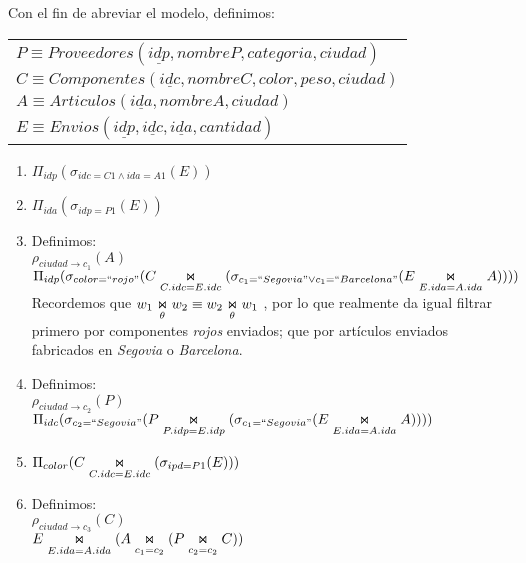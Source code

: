 Con el fin de abreviar el modelo, definimos:
	\begin{center}
		\begin{tabular}{l}
			$P \equiv Proveedores(\underline{idp}, nombreP, categoria, ciudad)$\\
			$C \equiv Componentes(\underline{idc}, nombreC, color, peso, ciudad)$\\
			$A \equiv Articulos(\underline{ida}, nombreA, ciudad)$\\
			$E \equiv Envios(\underline{idp}, \underline{idc}, \underline{ida}, cantidad)$\\
		\end{tabular}
	\end{center}
	\begin{enumerate}
		\item $\Pi_{idp}(\sigma_{idc = C1 \wedge ida = A1}(E))$
		
		\item $\Pi_{ida}(\sigma_{idp = P1}(E))$
		
		\item Definimos:\\ 
		$\rho_{ciudad\rightarrow c_1}(A)$\\
		$\Pi_{idp}(\sigma_{color=``rojo"}(C\innerjoin[C.idc = E.idc](\sigma_{c_1 = ``Segovia" \vee c_1 = ``Barcelona"}(E \innerjoin[E.ida = A.ida] A))))$\\[0.25cm]
		Recordemos que $w_1 \innerjoin w_2 \equiv w_2 \innerjoin w_1$ , por lo que realmente da igual filtrar primero por %
		componentes \textit{rojos} enviados; que por artículos enviados fabricados en \textit{Segovia} o \textit{Barcelona}.
		
		\item Definimos:\\
		$\rho_{ciudad\rightarrow c_2}(P)$\\
		$\Pi_{idc}(\sigma_{c_2 = ``Segovia"} (P \innerjoin[P.idp = E.idp] (\sigma_{c_1 = ``Segovia"} (E \innerjoin[E.ida = A.ida] A))))$
		
		\item $\Pi_{color}(C\innerjoin[C.idc = E.idc](\sigma_{ipd = P1}(E)))$
		
		\item Definimos:\\
		$\rho_{ciudad\rightarrow c_3}(C)$\\
		$E\innerjoin[E.ida = A.ida] (A\innerjoin[c_1 = c_2](P\innerjoin[c_2 = c_2]C))$\\
	\end{enumerate}